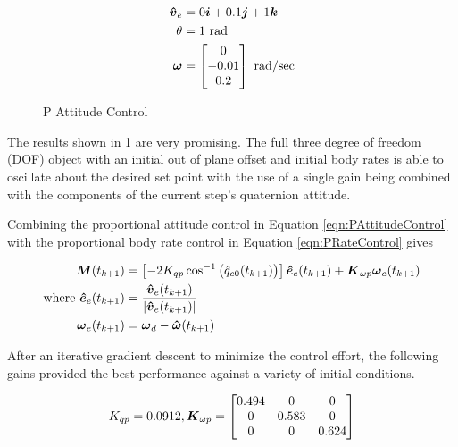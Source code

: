 \begin{subequations}
  \begin{align}
    \boldsymbol{\hat{v}}_e &= 0\boldsymbol{i}+0.1\boldsymbol{j}+1 \boldsymbol{k}\\
    \theta &= 1 \text{ rad} \\
    \boldsymbol{\omega} &= \begin{bmatrix} 0 \\ -0.01 \\ 0.2 \end{bmatrix} \text{ rad/sec}
  \end{align}
\end{subequations}

\begin{figure}[H]
  \centerline{}
  \caption{P Attitude Control}
  \label{fig:PAttitudeControl}
\end{figure}

The results shown in \ref{fig:PAttitudeControl} are very promising.  The full three degree of freedom (DOF) object with an initial out of plane offset and initial body rates is able to oscillate about the desired set point with the use of a single gain being combined with the components of the current step's quaternion attitude.

Combining the proportional attitude control in Equation \ref{eqn:PAttitudeControl} with the proportional body rate control in Equation \ref{eqn:PRateControl} gives

\begin{subequations}
  \begin{align}
    \boldsymbol{M}(t_{k+1}) &= \left[-2 K_{qp} \cos^{-1} \big(\hat{q}_{e0}(t_{k+1}) \big) \right] \boldsymbol{\hat{e}}_e(t_{k+1}) + \boldsymbol{K}_{\omega p} \boldsymbol{\omega}_e(t_{k+1})\\
    \text{where } \boldsymbol{\hat{e}}_e(t_{k+1}) &= \frac{\boldsymbol{\hat{v}}_e(t_{k+1})}{|\boldsymbol{\hat{v}}_e(t_{k+1})|} \\
    \boldsymbol{\omega}_e(t_{k+1}) &= \boldsymbol{\omega}_d - \boldsymbol{\hat{\omega}}(t_{k+1})
  \end{align}
  \label{eqn:PAttitudeAndRateControl}
\end{subequations}

After an iterative gradient descent to minimize the control effort, the following gains provided the best performance against a variety of initial conditions.

\begin{equation}
  K_{qp} = 0.0912, \boldsymbol{K}_{\omega p} = \begin{bmatrix} 0.494 & 0 & 0 \\ 0 & 0.583 & 0 \\ 0 & 0 & 0.624 \end{bmatrix}
\end{equation}

